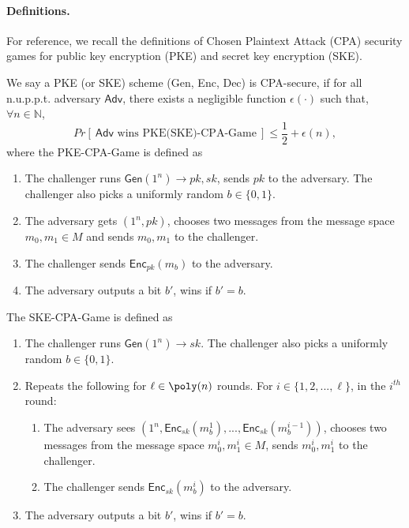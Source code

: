 \paragraph{Definitions.}
For reference, we recall the definitions of Chosen Plaintext Attack (CPA) security games for public key encryption (PKE) and secret key encryption (SKE).

\begin{definition}
We say a PKE (or SKE) scheme (Gen, Enc, Dec) is CPA-secure, if for all n.u.p.p.t. adversary $\mathsf{Adv}$, there exists a negligible function $\epsilon(\cdot)$ such that, $\forall n \in \mathbb{N}$,
\begin{equation*}
    Pr[ ~\mathsf{Adv}\text{ wins PKE(SKE)-CPA-Game} ~]\leq \frac{1}{2} + \epsilon(n),
\end{equation*}
where the PKE-CPA-Game is defined as
\begin{enumerate}
\item The challenger runs $\mathsf{Gen}(1^n)\rightarrow pk, sk$, sends $pk$ to the adversary. The challenger also picks a uniformly random $b\in\{0, 1\}$. 
\item The adversary gets $(1^n, pk)$, chooses two messages from the message space $m_0, m_1\in M$ and sends $m_0, m_1$ to the challenger. 
\item The challenger sends $\mathsf{Enc}_{pk}(m_b)$ to the adversary.
\item The adversary outputs a bit $b'$, wins if $b' = b$.
\end{enumerate}

The SKE-CPA-Game is defined as
\begin{enumerate}
\item The challenger runs $\mathsf{Gen}(1^n)\rightarrow sk$. The challenger also picks a uniformly random $b\in\{0, 1\}$. 
\item Repeats the following for $\ell\in \poly(n)$ rounds. For $i\in\{1, 2, ..., \ell\}$,  in the $i^{th}$ round:
\begin{enumerate}
\item The adversary sees $(1^n, \mathsf{Enc}_{sk}(m^1_b), ..., \mathsf{Enc}_{sk}(m^{i-1}_b))$, chooses two messages from the message space $m^i_0, m^i_1\in M$, sends $m^i_0, m^i_1$ to the challenger. 
\item The challenger sends $\mathsf{Enc}_{sk}(m^i_b)$ to the adversary.
\end{enumerate}
\item The adversary outputs a bit $b'$, wins if $b' = b$.
\end{enumerate}
\end{definition}

